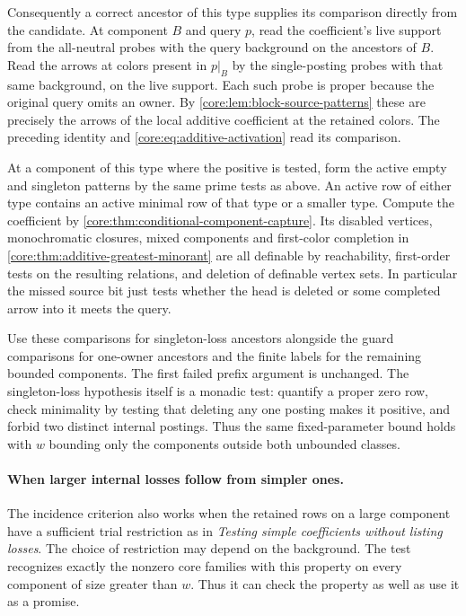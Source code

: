 Consequently a correct ancestor of this type supplies its
comparison directly from the candidate. At component $B$
and query $p$, read the coefficient's live support from the
all-neutral probes with the query background on the ancestors
of $B$. Read the arrows at colors present in $p|_B$ by the
single-posting probes with that same background, on the live
support. Each such probe is proper because the original
query omits an owner. By
\cref{core:lem:block-source-patterns} these are precisely the
arrows of the local additive coefficient at the retained
colors. The preceding identity and
\eqref{core:eq:additive-activation} read its comparison.

At a component of this type where the positive is tested,
form the active empty and singleton patterns by the same
prime tests as above. An active row of either type contains
an active minimal row of that type or a smaller type.
Compute the coefficient by
\cref{core:thm:conditional-component-capture}. Its disabled
vertices, monochromatic closures, mixed components and
first-color completion in
\cref{core:thm:additive-greatest-minorant} are all definable
by reachability, first-order tests on the resulting relations,
and deletion of definable vertex sets. In particular the
missed source bit just tests whether the head is deleted or
some completed arrow into it meets the query.

Use these comparisons for singleton-loss ancestors alongside
the guard comparisons for one-owner ancestors and the finite
labels for the remaining bounded components. The first failed
prefix argument is unchanged. The singleton-loss hypothesis
itself is a monadic test: quantify a proper zero row, check
minimality by testing that deleting any one posting makes it
positive, and forbid two distinct internal postings. Thus the
same fixed-parameter bound holds with $w$ bounding only the
components outside both unbounded classes.

\paragraph{When larger internal losses follow from simpler ones.}
The incidence criterion also works when the retained rows on a
large component have a sufficient trial restriction as in
\emph{Testing simple coefficients without listing losses}.
The choice of restriction may depend on the background.
The test recognizes exactly the nonzero core families with
this property on every component of size greater than $w$.
Thus it can check the property as well as use it as a promise.

